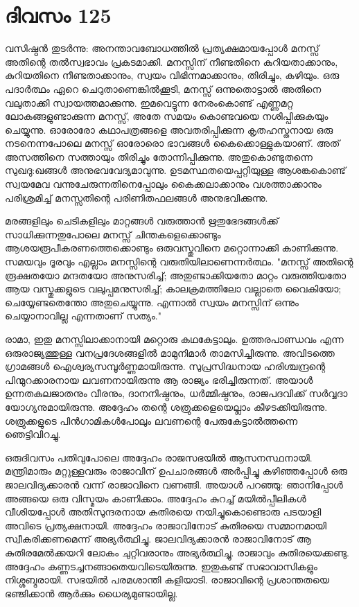 \newpage
\section{ദിവസം 125}


വസിഷ്ഠന്‍ തുടര്‍ന്നു: അനന്താവബോധത്തില്‍ പ്രത്യക്ഷമായപ്പോള്‍ മനസ്സ്‌ അതിന്റെ തല്‍സ്വഭാവം പ്രകടമാക്കി. മനസ്സിന് നീണ്ടതിനെ കുറിയതാക്കാനും, കുറിയതിനെ നീണ്ടതാക്കാനും, സ്വയം വിഭിന്നമാക്കാനും, തിരിച്ചും, കഴിയും. ഒരു പദാര്‍ത്ഥം ഏറെ ചെറുതാണെങ്കില്‍ക്കൂടി, മനസ്സ്‌ ഒന്നുതൊട്ടാല്‍ അതിനെ വലുതാക്കി സ്വായത്തമാക്കുന്നു. ഇമവെട്ടുന്ന നേരംകൊണ്ട്‌ എണ്ണമറ്റ ലോകങ്ങളുണ്ടാക്കുന്ന മനസ്സ്‌, അതേ സമയം കൊണ്ടവയെ നശിപ്പിക്കുകയും ചെയ്യുന്നു. ഓരോരോ കഥാപത്രങ്ങളെ അവതരിപ്പിക്കുന്ന കൃതഹസ്തനായ ഒരു നടനെന്നപോലെ മനസ്സ്‌ ഓരോരൊ ഭാവങ്ങള്‍ കൈക്കൊള്ളുകയാണ്‌. അത്‌ അസത്തിനെ സത്തായും തിരിച്ചും തോന്നിപ്പിക്കുന്നു. അതുകൊണ്ടുതന്നെ സുഖദു:ഖങ്ങള്‍ അനുഭവവേദ്യമാവുന്നു. ഉടമസ്ഥതയെപ്പറ്റിയുള്ള ആശങ്കകൊണ്ട്‌ സ്വയമേവ വന്നുചേരുന്നതിനെപ്പോലും കൈക്കലാക്കാനും വശത്താക്കാനും പരിശ്രമിച്ച്‌ മനസ്സതിന്റെ പരിണിതഫലങ്ങള്‍ അനുഭവിക്കുന്നു.

മരങ്ങളിലും ചെടികളിലും മാറ്റങ്ങള്‍ വരുത്താന്‍ ഋതുഭേദങ്ങള്‍ക്ക്‌ സാധിക്കുന്നതുപോലെ മനസ്സ്‌ ചിന്തകളെക്കൊണ്ടും ആശയരൂപീകരണത്തെക്കൊണ്ടും ഒരുവസ്തുവിനെ മറ്റൊന്നാക്കി കാണിക്കുന്നു. സമയവും ദൂരവും എല്ലാം മനസ്സിന്റെ വരുതിയിലാണെന്നര്‍ത്ഥം. "മനസ്സ്‌ അതിന്റെ രൂക്ഷതയോ മന്ദതയോ അനുസരിച്ച്‌; അതുണ്ടാക്കിയതോ മാറ്റം വരുത്തിയതോ ആയ വസ്തുക്കളുടെ വലുപ്പമനുസരിച്ച്‌; കാലക്രമത്തിലോ വല്ലാതെ വൈകിയോ; ചെയ്യേണ്ടതെന്തോ അതുചെയ്യുന്നു. എന്നാല്‍ സ്വയം മനസ്സിന്‌ ഒന്നും ചെയ്യാനാവില്ല എന്നതാണ്‌ സത്യം."

രാമാ, ഇതു മനസ്സിലാക്കാനായി മറ്റൊരു കഥകേട്ടാലും. ഉത്തരപാണ്ഡവം എന്ന ഒരുരാജ്യത്തുള്ള വനപ്രദേശങ്ങളില്‍ മാമുനിമാര്‍ താമസിച്ചിരുന്നു. അവിടത്തെ ഗ്രാമങ്ങള്‍ ഐശ്വര്യസമ്പൂര്‍ണ്ണമായിരുന്നു. സുപ്രസിദ്ധനായ ഹരിശ്ചന്ദ്രന്റെ പിന്മുറക്കാരനായ ലവണനായിരുന്നു ആ രാജ്യം ഭരിച്ചിരുന്നത്‌. അയാള്‍ ഉന്നതകുലജാതനും വീരനും, ദാനനിഷ്ഠനും, ധര്‍മ്മിഷ്ഠനും, രാജപദവിക്ക്‌ സര്‍വ്വദാ യോഗ്യനുമായിരുന്നു. അദ്ദേഹം തന്റെ ശത്രുക്കളെയെല്ലാം കീഴടക്കിയിരുന്നു. ശത്രുക്കളുടെ പിന്‍ഗാമികള്‍പോലും ലവണന്റെ പേരുകേട്ടാല്‍ത്തന്നെ ഞെട്ടിവിറച്ചു.

ഒരുദിവസം പതിവുപോലെ അദ്ദേഹം രാജസഭയില്‍ ആസനസ്ഥനായി. മന്ത്രിമാരും മറ്റുള്ളവരും രാജാവിന്‌ ഉപചാരങ്ങള്‍ അര്‍പ്പിച്ചു  കഴിഞ്ഞപ്പോള്‍ ഒരു ജാലവിദ്യക്കാരന്‍ വന്ന് രാജാവിനെ വണങ്ങി. അയാള്‍ പറഞ്ഞു: ഞാനിപ്പോള്‍ അങ്ങയെ ഒരു വിസ്മയം കാണിക്കാം. അദ്ദേഹം കുറച്ച്‌ മയില്‍പ്പീലികള്‍ വീശിയപ്പോള്‍ അതിസുന്ദരനായ കുതിരയെ നയിച്ചുകൊണ്ടൊരു പടയാളി അവിടെ പ്രത്യക്ഷനായി. അദ്ദേഹം രാജാവിനോട്‌ കുതിരയെ സമ്മാനമായി സ്വീകരിക്കണമെന്ന് അഭ്യര്‍ത്ഥിച്ചു. ജാലവിദ്യക്കാരന്‍ രാജാവിനോട്‌ ആ കുതിരമേല്‍ക്കയറി ലോകം ചുറ്റിവരാനും അഭ്യര്‍ത്ഥിച്ചു. രാജാവും കുതിരയെക്കണ്ടു. അദ്ദേഹം കണ്ണടച്ചനങ്ങാതെയവിടെയിരുന്നു. ഇതുകണ്ട്‌ സഭാവാസികളും നിശ്ശബ്ദരായി. സഭയില്‍ പരമശാന്തി കളിയാടി. രാജാവിന്റെ പ്രശാന്തതയെ ഭഞ്ജിക്കാന്‍ ആര്‍ക്കും ധൈര്യമുണ്ടായില്ല.

